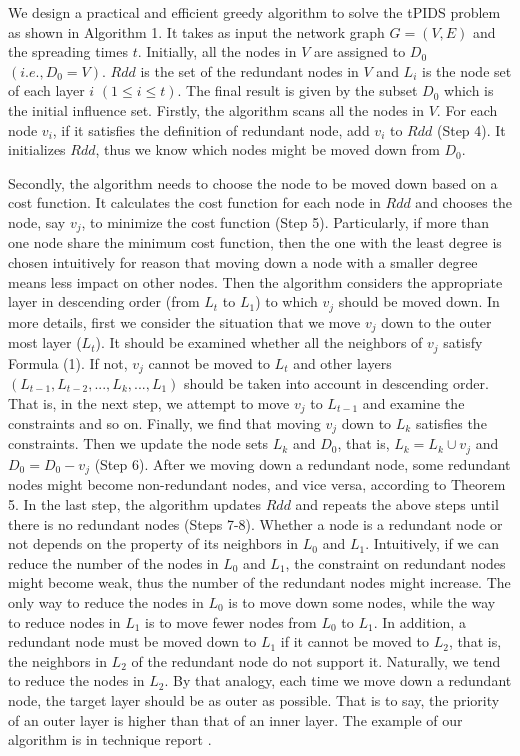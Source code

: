 We design a practical and efficient greedy algorithm to solve the tPIDS problem as shown in Algorithm 1. It takes as input the network graph $G=(V,E)$ and the spreading times $t$. Initially, all the nodes in $V$ are assigned to $D_0$ $(i.e.,D_0=V)$. $Rdd$ is the set of the redundant nodes in $V$ and $L_i$ is the node set of each layer $i$ $(1\leqslant i \leqslant t)$. The final result is given by the subset $D_0$ which is the initial influence set.
Firstly, the algorithm scans all the nodes in $V$. For each node $v_i$, if it satisfies the definition of redundant node, add $v_i$ to $Rdd$ (Step 4). It initializes $Rdd$, thus we know which nodes might be moved down from $D_0$.

Secondly, the algorithm needs to choose the node to be moved down based on a cost function. It calculates the cost function for each node in $Rdd$ and chooses the node, say $v_j$, to minimize the cost function (Step 5). Particularly, if more than one node share the minimum cost function, then the one with the least degree is chosen intuitively for reason that moving down a node with a smaller degree means less impact on other nodes. Then the algorithm considers the appropriate layer in descending order (from $L_t$ to $L_1$) to which $v_j$ should be moved down. In more details, first we consider the situation that we move $v_j$ down to the outer most layer ($L_t$). It should be examined whether all the neighbors of $v_j$ satisfy Formula (1). If not, $v_j$ cannot be moved to $L_t$ and other layers $(L_{t-1},L_{t-2},...,L_k,...,L_1)$ should be taken into account in descending order. That is, in the next step, we attempt to move $v_j$ to $L_{t-1}$ and examine the constraints and so on. Finally, we find that moving $v_j$ down to $L_k$ satisfies the constraints. Then we update the node sets $L_k$ and $D_0$, that is, $L_k=L_k \cup {v_j}$ and $D_0=D_0-{v_j}$ (Step 6). After we moving down a redundant node, some redundant nodes might become non-redundant nodes, and vice versa, according to Theorem 5. In the last step, the algorithm updates $Rdd$ and repeats the above steps until there is no redundant nodes (Steps 7-8).
Whether a node is a redundant node or not depends on the property of its neighbors in $L_0$ and $L_1$. Intuitively, if we can reduce the number of the nodes in $L_0$ and $L_1$, the constraint on redundant nodes might become weak, thus the number of the redundant nodes might increase. The only way to reduce the nodes in $L_0$ is to move down some nodes, while the way to reduce nodes in $L_1$ is to move fewer nodes from $L_0$ to $L_1$. In addition, a redundant node must be moved down to $L_1$ if it cannot be moved to $L_2$, that is, the neighbors in $L_2$ of the redundant node do not support it. Naturally, we tend to reduce the nodes in $L_2$. By that analogy, each time we move down a redundant node, the target layer should be as outer as possible. That is to say, the priority of an outer layer is higher than that of an inner layer.
The example of our algorithm is in technique report \cite{ShiTech}.
